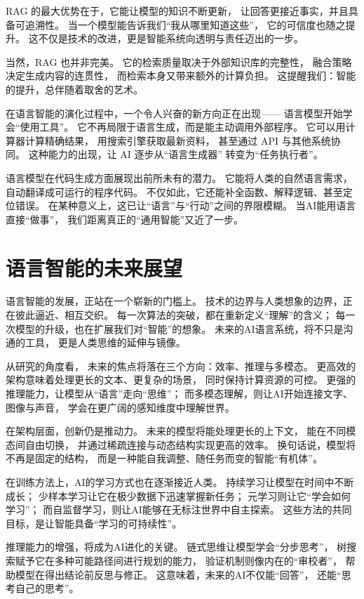 RAG 的最大优势在于，它能让模型的知识不断更新，  
让回答更接近事实，并且具备可追溯性。  
当一个模型能告诉我们“我从哪里知道这些”，  
它的可信度也随之提升。  
这不仅是技术的改进，更是智能系统向透明与责任迈出的一步。  

当然，RAG 也并非完美。  
它的检索质量取决于外部知识库的完整性，  
融合策略决定生成内容的连贯性，  
而检索本身又带来额外的计算负担。  
这提醒我们：智能的提升，总伴随着取舍的艺术。  

在语言智能的演化过程中，一个令人兴奋的新方向正在出现——  
语言模型开始学会“使用工具”。  
它不再局限于语言生成，而是能主动调用外部程序。  
它可以用计算器计算精确结果，  
用搜索引擎获取最新资料，  
甚至通过 API 与其他系统协同。  
这种能力的出现，让 AI 逐步从“语言生成器”  
转变为“任务执行者”。  

语言模型在代码生成方面展现出前所未有的潜力。  
它能将人类的自然语言需求，  
自动翻译成可运行的程序代码。  
不仅如此，它还能补全函数、解释逻辑、甚至定位错误。  
在某种意义上，这已让“语言”与“行动”之间的界限模糊。  
当AI能用语言直接“做事”，  
我们距离真正的“通用智能”又近了一步。  

\section{语言智能的未来展望}

语言智能的发展，正站在一个崭新的门槛上。  
技术的边界与人类想象的边界，正在彼此逼近、相互交织。  
每一次算法的突破，都在重新定义“理解”的含义；  
每一次模型的升级，也在扩展我们对“智能”的想象。  
未来的AI语言系统，将不只是沟通的工具，  
更是人类思维的延伸与镜像。  

从研究的角度看，  
未来的焦点将落在三个方向：效率、推理与多模态。  
更高效的架构意味着处理更长的文本、更复杂的场景，  
同时保持计算资源的可控。  
更强的推理能力，让模型从“语言”走向“思维”；  
而多模态理解，则让AI开始连接文字、图像与声音，  
学会在更广阔的感知维度中理解世界。  

在架构层面，创新仍是推动力。  
未来的模型将能处理更长的上下文，  
能在不同模态间自由切换，  
并通过稀疏连接与动态结构实现更高的效率。  
换句话说，模型将不再是固定的结构，  
而是一种能自我调整、随任务而变的智能“有机体”。  

在训练方法上，AI的学习方式也在逐渐接近人类。  
持续学习让模型在时间中不断成长；  
少样本学习让它在极少数据下迅速掌握新任务；  
元学习则让它“学会如何学习”；  
而自监督学习，则让AI能够在无标注世界中自主探索。  
这些方法的共同目标，是让智能具备“学习的可持续性”。  

推理能力的增强，将成为AI进化的关键。  
链式思维让模型学会“分步思考”，  
树搜索赋予它在多种可能路径间进行规划的能力，  
验证机制则像内在的“审校者”，  
帮助模型在得出结论前反思与修正。  
这意味着，未来的AI不仅能“回答”，  
还能“思考自己的思考”。  

